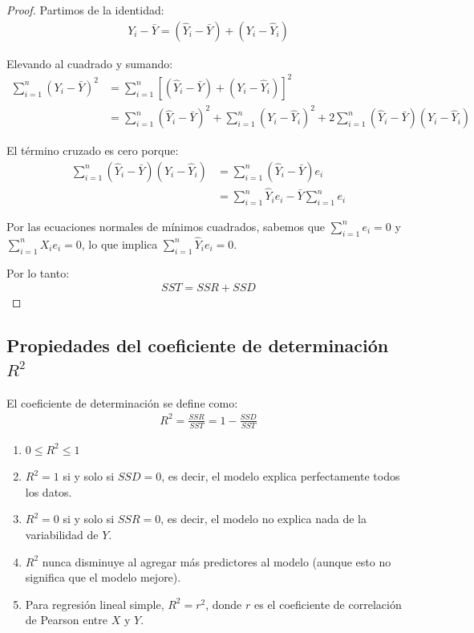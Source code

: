 \begin{proof}
	Partimos de la identidad:
	\begin{align}
		Y_i - \bar{Y} = (\hat{Y}_i - \bar{Y}) + (Y_i - \hat{Y}_i)
	\end{align}
	
	Elevando al cuadrado y sumando:
	\begin{align}
		\sum_{i=1}^{n} (Y_i - \bar{Y})^2 &= \sum_{i=1}^{n} \left[ (\hat{Y}_i - \bar{Y}) + (Y_i - \hat{Y}_i) \right]^2 \\
		&= \sum_{i=1}^{n} (\hat{Y}_i - \bar{Y})^2 + \sum_{i=1}^{n} (Y_i - \hat{Y}_i)^2 + 2\sum_{i=1}^{n} (\hat{Y}_i - \bar{Y})(Y_i - \hat{Y}_i)
	\end{align}
	
	El término cruzado es cero porque:
	\begin{align}
		\sum_{i=1}^{n} (\hat{Y}_i - \bar{Y})(Y_i - \hat{Y}_i) &= \sum_{i=1}^{n} (\hat{Y}_i - \bar{Y})e_i \\
		&= \sum_{i=1}^{n} \hat{Y}_i e_i - \bar{Y} \sum_{i=1}^{n} e_i
	\end{align}
	
	Por las ecuaciones normales de mínimos cuadrados, sabemos que $\sum_{i=1}^{n} e_i = 0$ y $\sum_{i=1}^{n} X_i e_i = 0$, lo que implica $\sum_{i=1}^{n} \hat{Y}_i e_i = 0$.
	
	Por lo tanto:
	\begin{align}
		SST = SSR + SSD
	\end{align}
\end{proof}

\subsection{Propiedades del coeficiente de determinación $R^2$}

El coeficiente de determinación se define como:
\begin{align}
	R^2 = \frac{SSR}{SST} = 1 - \frac{SSD}{SST}
\end{align}

\begin{observacion}[Propiedades de $R^2$]
	\begin{enumerate}
		\item $0 \leq R^2 \leq 1$
		\item $R^2 = 1$ si y solo si $SSD = 0$, es decir, el modelo explica perfectamente todos los datos.
		\item $R^2 = 0$ si y solo si $SSR = 0$, es decir, el modelo no explica nada de la variabilidad de $Y$.
		\item $R^2$ nunca disminuye al agregar más predictores al modelo (aunque esto no significa que el modelo mejore).
		\item Para regresión lineal simple, $R^2 = r^2$, donde $r$ es el coeficiente de correlación de Pearson entre $X$ y $Y$.
	\end{enumerate}
\end{observacion}

